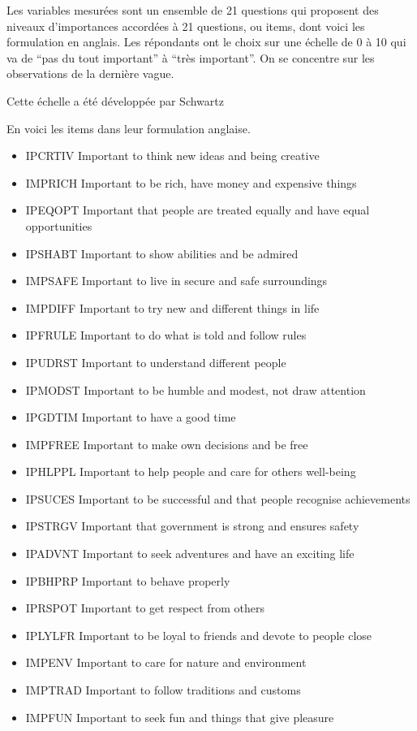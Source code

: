 \documentclass[
]{book}
\providecommand{\tightlist}{%
  \setlength{\itemsep}{0pt}\setlength{\parskip}{0pt}}
\begin{document}
Les variables mesurées sont un ensemble de 21 questions qui proposent des niveaux d'importances accordées à 21 questions, ou items, dont voici les formulation en anglais. Les répondants ont le choix sur une échelle de 0 à 10 qui va de ``pas du tout important'' à ``très important''. On se concentre sur les observations de la dernière vague.

Cette échelle a été développée par Schwartz

En voici les items dans leur formulation anglaise.

\begin{itemize}
\tightlist
\item
  IPCRTIV Important to think new ideas and being creative
\item
  IMPRICH Important to be rich, have money and expensive things
\item
  IPEQOPT Important that people are treated equally and have equal opportunities
\item
  IPSHABT Important to show abilities and be admired
\item
  IMPSAFE Important to live in secure and safe surroundings
\item
  IMPDIFF Important to try new and different things in life
\item
  IPFRULE Important to do what is told and follow rules
\item
  IPUDRST Important to understand different people
\item
  IPMODST Important to be humble and modest, not draw attention
\item
  IPGDTIM Important to have a good time
\item
  IMPFREE Important to make own decisions and be free
\item
  IPHLPPL Important to help people and care for others well-being
\item
  IPSUCES Important to be successful and that people recognise achievements
\item
  IPSTRGV Important that government is strong and ensures safety
\item
  IPADVNT Important to seek adventures and have an exciting life
\item
  IPBHPRP Important to behave properly
\item
  IPRSPOT Important to get respect from others
\item
  IPLYLFR Important to be loyal to friends and devote to people close
\item
  IMPENV Important to care for nature and environment
\item
  IMPTRAD Important to follow traditions and customs
\item
  IMPFUN Important to seek fun and things that give pleasure
\end{itemize}
\end{document}
